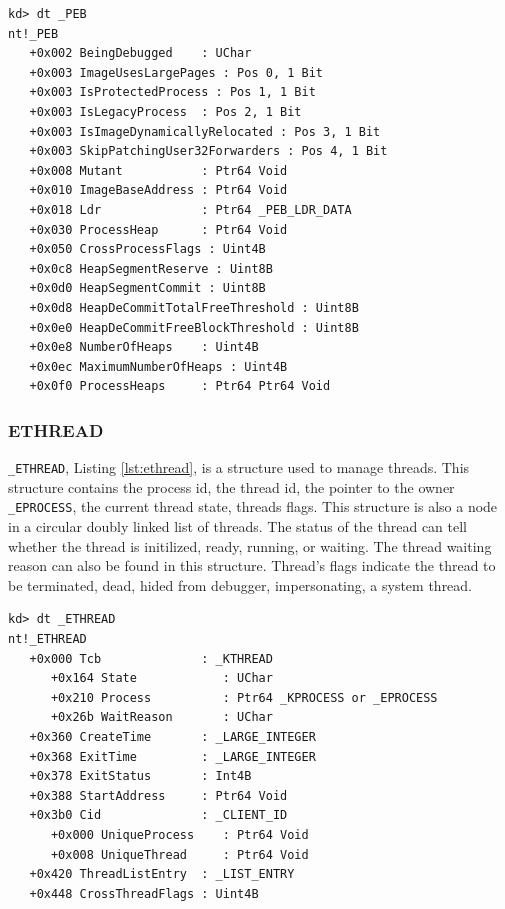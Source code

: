 \begin{lstlisting}[language=windbg,label={lst:peb},caption=\texttt{\_PEB} in Windows 7,float,floatplacement=H]
kd> dt _PEB
nt!_PEB
   +0x002 BeingDebugged    : UChar
   +0x003 ImageUsesLargePages : Pos 0, 1 Bit
   +0x003 IsProtectedProcess : Pos 1, 1 Bit
   +0x003 IsLegacyProcess  : Pos 2, 1 Bit
   +0x003 IsImageDynamicallyRelocated : Pos 3, 1 Bit
   +0x003 SkipPatchingUser32Forwarders : Pos 4, 1 Bit
   +0x008 Mutant           : Ptr64 Void
   +0x010 ImageBaseAddress : Ptr64 Void
   +0x018 Ldr              : Ptr64 _PEB_LDR_DATA
   +0x030 ProcessHeap      : Ptr64 Void
   +0x050 CrossProcessFlags : Uint4B
   +0x0c8 HeapSegmentReserve : Uint8B
   +0x0d0 HeapSegmentCommit : Uint8B
   +0x0d8 HeapDeCommitTotalFreeThreshold : Uint8B
   +0x0e0 HeapDeCommitFreeBlockThreshold : Uint8B
   +0x0e8 NumberOfHeaps    : Uint4B
   +0x0ec MaximumNumberOfHeaps : Uint4B
   +0x0f0 ProcessHeaps     : Ptr64 Ptr64 Void
\end{lstlisting}

\subsubsection[ETHREAD]{ETHREAD}

\texttt{\_ETHREAD}, Listing \ref{lst:ethread}, is a structure used to manage
threads. This structure contains the process id, the thread id, the pointer to
the owner \texttt{\_EPROCESS}, the current thread state, threads flags. This
structure is also a node in a circular doubly linked list of threads. The
status of the thread can tell whether the thread is initilized, ready, running,
or waiting.  The thread waiting reason can also be found in this structure.
Thread's flags indicate the thread to be terminated, dead, hided from debugger,
impersonating, a system thread.

\begin{lstlisting}[language=windbg,label={lst:ethread},caption=\texttt{\_ETHREAD} in Windows 7,float,floatplacement=H]
kd> dt _ETHREAD
nt!_ETHREAD
   +0x000 Tcb              : _KTHREAD
      +0x164 State            : UChar
      +0x210 Process          : Ptr64 _KPROCESS or _EPROCESS
      +0x26b WaitReason       : UChar
   +0x360 CreateTime       : _LARGE_INTEGER
   +0x368 ExitTime         : _LARGE_INTEGER
   +0x378 ExitStatus       : Int4B
   +0x388 StartAddress     : Ptr64 Void
   +0x3b0 Cid              : _CLIENT_ID
      +0x000 UniqueProcess    : Ptr64 Void
      +0x008 UniqueThread     : Ptr64 Void
   +0x420 ThreadListEntry  : _LIST_ENTRY
   +0x448 CrossThreadFlags : Uint4B
\end{lstlisting}

